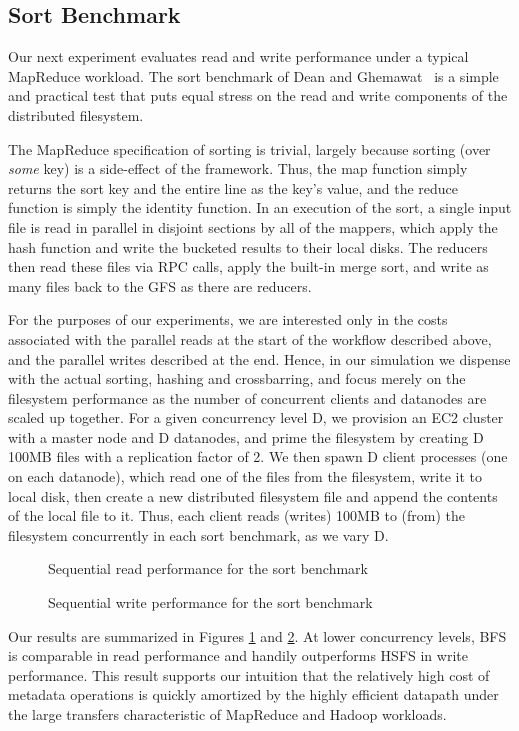 \documentclass{article}
\begin{document}
\subsection{Sort Benchmark}
Our next experiment evaluates read and write performance under a
typical MapReduce workload.  The sort benchmark of Dean and
Ghemawat~\cite{mapreduce} is a simple and practical test that puts
equal stress on the read and write components of the distributed
filesystem.

The MapReduce specification of sorting is trivial, largely because
sorting (over \emph{some} key) is a side-effect of the framework.
Thus, the map function simply returns the sort key and the entire line
as the key's value, and the reduce function is simply the identity
function.  In an execution of the sort, a single input file is read in
parallel in disjoint sections by all of the mappers, which apply the
hash function and write the bucketed results to their local disks.
The reducers then read these files via RPC calls, apply the built-in
merge sort, and write as many files back to the GFS as there are
reducers.

For the purposes of our experiments, we are interested only in the
costs associated with the parallel reads at the start of the workflow
described above, and the parallel writes described at the end.  Hence,
in our simulation we dispense with the actual sorting, hashing and
crossbarring, and focus merely on the filesystem performance as the
number of concurrent clients and datanodes are scaled up together.
For a given concurrency level D, we provision an EC2 cluster with a
master node and D datanodes, and prime the filesystem by creating D
100MB files with a replication factor of 2.  We then spawn D client
processes (one on each datanode), which read one of the files from the
filesystem, write it to local disk, then create a new distributed
filesystem file and append the contents of the local file to it.
Thus, each client reads (writes) 100MB to (from) the filesystem
concurrently in each sort benchmark, as we vary D.

\begin{figure}
\centering
{}
\caption{Sequential read performance for the sort benchmark}
\label{fig:big-read-perf}
\end{figure}
\begin{figure}
\centering
{}
\caption{Sequential write performance for the sort benchmark}
\label{fig:big-write-perf}
\end{figure}
Our results are summarized in Figures \ref{fig:big-read-perf} and
\ref{fig:big-write-perf}.  At lower concurrency levels, BFS is
comparable in read performance and handily outperforms HSFS in write
performance.  This result supports our intuition that the relatively
high cost of metadata operations is quickly amortized by the highly
efficient datapath under the large transfers characteristic of
MapReduce and Hadoop workloads.
\end{document}
